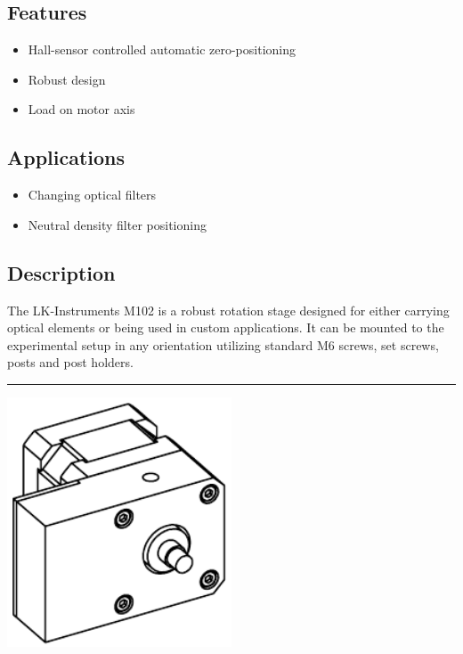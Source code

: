 \documentclass[a4paper, final, 12pt, oneside]{scrartcl}
\numberwithin{equation}{section}
\numberwithin{table}{section}
\numberwithin{figure}{section}
\begin{document}
\begin{multicols}{2}
\subsection*{Features}
\begin{itemize}
  \item[] Hall-sensor controlled automatic zero-positioning
  \item[] Robust design
  \item[] Load on motor axis
\end{itemize}
\FloatBarrier

\subsection*{Applications}
\begin{itemize}
  \item[] Changing optical filters
  \item[] Neutral density filter positioning
\end{itemize}
\FloatBarrier

\subsection*{Description}
The LK-Instruments M102 is a robust rotation stage designed for either carrying optical elements or being used in custom applications. It can be mounted to the experimental setup in any orientation utilizing standard M6 screws, set screws, posts and post holders.
\end{multicols}
\noindent\rule{\textwidth}{0.4pt}
\vspace*{0.5cm}

\centerline{\includegraphics[width=0.5\textwidth]{./drawings/M102_iso.pdf}}
\end{document}
